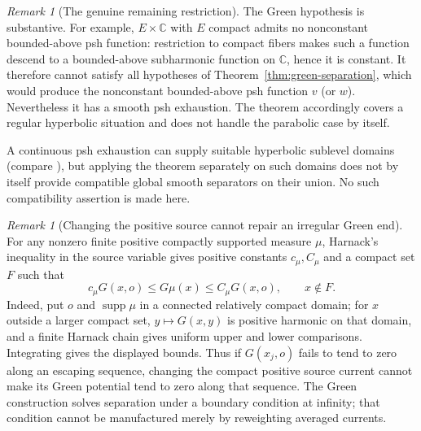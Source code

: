 \documentclass[11pt]{article}
\theoremstyle{remark}
\newtheorem{remark}[theorem]{Remark}
\newcommand{\supp}{\operatorname{supp}}
\begin{document}
\begin{remark}[The genuine remaining restriction]
The Green hypothesis is substantive. For example, $E\times\mathbb C$
with $E$ compact admits no nonconstant bounded-above psh function:
restriction to compact fibers makes such a function descend to a
bounded-above subharmonic function on $\mathbb C$, hence it is
constant. It therefore cannot satisfy all hypotheses of
Theorem~\ref{thm:green-separation}, which would produce the
nonconstant bounded-above psh function $v$ (or $w$). Nevertheless
it has a smooth psh exhaustion. The theorem accordingly covers a
regular hyperbolic situation and does not handle the parabolic
case by itself.

A continuous psh exhaustion can supply suitable hyperbolic
sublevel domains (compare \cite[proof of Theorem~2.5, p.~1360]{NR}),
but applying the theorem separately on such domains does not by
itself provide compatible global smooth separators on their union.
No such compatibility assertion is made here.

\end{remark}


\begin{remark}[Changing the positive source cannot repair an irregular Green end]
For any nonzero finite positive compactly supported measure $\mu$, Harnack's
inequality in the source variable gives positive constants $c_\mu,C_\mu$ and
a compact set $F$ such that
\[
 c_\mu G(x,o)\le G\mu(x)\le C_\mu G(x,o),\qquad x\notin F.
\]
Indeed, put $o$ and $\supp\mu$ in a connected relatively compact domain;
for $x$ outside a larger compact set, $y\mapsto G(x,y)$ is positive
harmonic on that domain, and a finite Harnack chain gives uniform
upper and lower comparisons. Integrating gives the displayed bounds.
Thus if $G(x_j,o)$ fails to tend to zero along an escaping sequence,
changing the compact positive source current cannot make its Green
potential tend to zero along that sequence. The Green construction
solves separation under a boundary condition at infinity; that condition
cannot be manufactured merely by reweighting averaged currents.
\end{remark}
\end{document}
